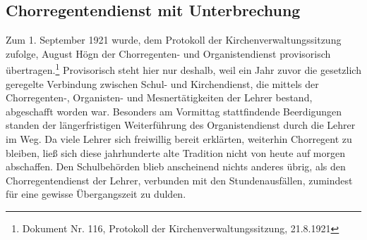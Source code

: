 \subsection{Chorregentendienst mit Unterbrechung}

Zum 1. September 1921 wurde, dem
Protokoll der Kirchenverwaltungssitzung zufolge, August Högn der
Chorregenten- und Organistendienst provisorisch übertragen.\footnote{
Dokument Nr. 116, Protokoll der Kirchenverwaltungssitzung, 21.8.1921}
Provisorisch steht hier nur deshalb, weil ein Jahr zuvor die gesetzlich
geregelte Verbindung zwischen Schul- und Kirchendienst, die mittels der
Chorregenten-, Organisten- und Mesnertätigkeiten der Lehrer bestand,
abgeschafft worden war. Besonders am Vormittag stattfindende
Beerdigungen standen der längerfristigen Weiterführung des
Organistendienst durch die Lehrer im Weg. Da viele Lehrer sich
freiwillig bereit erklärten, weiterhin Chorregent zu bleiben, ließ sich
diese jahrhunderte alte Tradition nicht von heute auf morgen
abschaffen. Den Schulbehörden blieb anscheinend nichts anderes übrig,
als den Chorregentendienst der Lehrer, verbunden mit den
Stundenausfällen, zumindest für eine gewisse Übergangszeit zu dulden.

